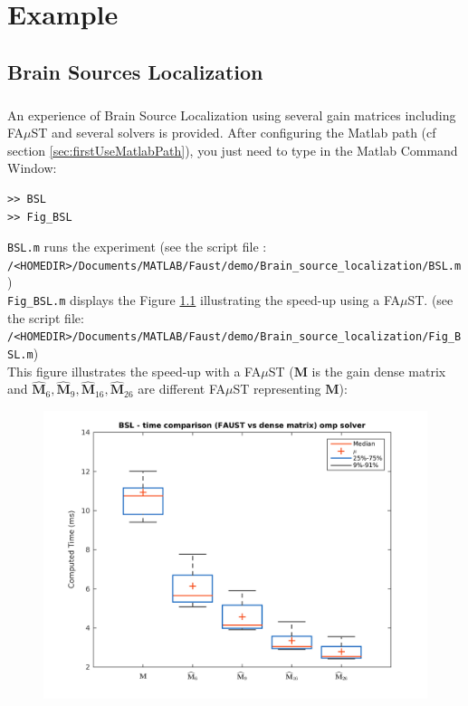 \chapter{Example}\label{sec:example}

\section{Brain Sources Localization}\label{sec:BSL_example}
%



\paragraph{} An experience of Brain Source Localization using several gain matrices including FA$\mu$ST and several solvers is provided. After configuring the Matlab path (cf section \ref{sec:firstUseMatlabPath}), you just need to type in the Matlab Command Window:
\begin{lstlisting}
>> BSL
>> Fig_BSL
\end{lstlisting}

\texttt{BSL.m} runs the experiment (see the script file :\\
\texttt{/<HOMEDIR>/Documents/MATLAB/Faust/demo/Brain\_source\_localization/BSL.m})\\
\texttt{Fig\_BSL.m} displays the Figure \ref{fig:BSL} illustrating the speed-up using a FA$\mu$ST. (see the script file:\\
\texttt{/<HOMEDIR>/Documents/MATLAB/Faust/demo/Brain\_source\_localization/Fig\_BSL.m}) \\

This figure illustrates the speed-up with a FA$\mu$ST ($\mathbf{M}$ is the gain dense matrix and $\widehat{\mathbf{M}}_{6},\widehat{\mathbf{M}}_{9},\widehat{\mathbf{M}}_{16},\widehat{\mathbf{M}}_{26}$ are different FA$\mu$ST representing  $\mathbf{M}$):

\begin{figure}[!htbp]
\label{fig:BSL}
\includegraphics[scale=0.7]{images/BSL.png}
\end{figure}
